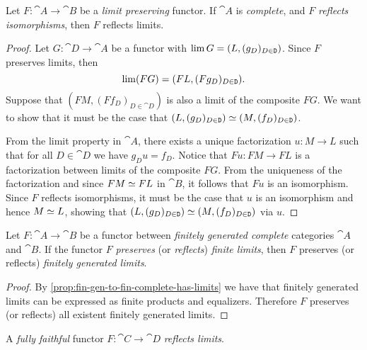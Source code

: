 \begin{proposition}
\label{prop:complete-reflect-iso-reflect-limits}
Let \(F: \cat A \to \cat B\) be a \emph{limit preserving} functor. If \(\cat A\)
is \emph{complete}, and \(F\) \emph{reflects isomorphisms}, then \(F\) reflects
limits.
\end{proposition}

\begin{proof}
Let \(G: \cat D \to \cat A\) be a functor with \(\operatorname{lim} G = (L, (g_D)_{D \in \texttt
  D})\). Since \(F\) preserves limits, then
\[
\operatorname{lim}(FG) = (F L, (F g_D)_{D \in \texttt D}).
\]
Suppose that \((F M, (F f_D)_{D \in \cat D})\) is also a limit of the composite
\(F G\). We want to show that it must be the case that
\((L, (g_D)_{D \in \texttt D}) \simeq (M, (f_D)_{D \in \texttt D})\).

From the limit property in \(\cat A\), there exists a unique factorization
\(u: M \to L\) such that for all \(D \in \cat D\) we have \(g_D u =
f_D\). Notice that \(F u: FM \to FL\) is a factorization between limits of the
composite \(F G\). From the uniqueness of the factorization and since
\(F M \simeq F L\) in \(\cat B\), it follows that \(F u\) is an isomorphism. Since
\(F\) reflects isomorphisms, it must be the case that \(u\) is an isomorphism
and hence \(M \simeq L\), showing that
\((L, (g_D)_{D \in \texttt D}) \simeq (M, (f_D)_{D \in \texttt D})\) via \(u\).
\end{proof}

\begin{proposition}
\label{prop:finitely-gen-limits-preserve-reflect}
Let \(F: \cat A \to \cat B\) be a functor between \emph{finitely generated
  complete} categories \(\cat A\) and \(\cat B\). If the functor \(F\)
\emph{preserves} (or \emph{reflects}) \emph{finite limits}, then \(F\) preserves
(or reflects) \emph{finitely generated limits}.
\end{proposition}

\begin{proof}
By \cref{prop:fin-gen-to-fin-complete-has-limits} we have that finitely
generated limits can be expressed as finite products and equalizers. Therefore
\(F\) preserves (or reflects) all existent finitely generated limits.
\end{proof}

\begin{proposition}
\label{prop:full-faithful-reflects}
A \emph{fully faithful} functor \(F: \cat C \to \cat D\)
\emph{reflects limits}.
\end{proposition}

